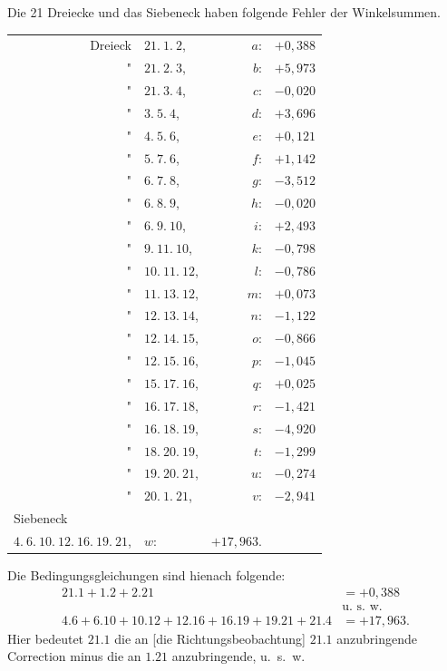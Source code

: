 \documentclass[12pt,a4paper]{article}
\theoremstyle{plain}
\theoremstyle{definition}
\theoremstyle{remark}
\begin{document}
Die 21 Dreiecke und das Siebeneck haben folgende Fehler der Winkelsummen.

\begin{center}
\begin{tabular}{r@{\ }l@{\ }r@{\ }l}
Dreieck & $21.\ 1.\ 2$, & $a$: & $+0{,}388$\\
" & $21.\ 2.\ 3$, & $b$: & $+5{,}973$\\
" & $21.\ 3.\ 4$, & $c$: & $-0{,}020$\\
" & $3.\ 5.\ 4$, & $d$: & $+3{,}696$\\
" & $4.\ 5.\ 6$, & $e$: & $+0{,}121$\\
" & $5.\ 7.\ 6$, & $f$: & $+1{,}142$\\
" & $6.\ 7.\ 8$, & $g$: & $-3{,}512$\\
" & $6.\ 8.\ 9$, & $h$: & $-0{,}020$\\
" & $6.\ 9.\ 10$, & $i$: & $+2{,}493$\\
" & $9.\ 11.\ 10$, & $k$: & $-0{,}798$\\
" & $10.\ 11.\ 12$, & $l$: & $-0{,}786$\\
" & $11.\ 13.\ 12$, & $m$: & $+0{,}073$\\
" & $12.\ 13.\ 14$, & $n$: & $-1{,}122$\\
" & $12.\ 14.\ 15$, & $o$: & $-0{,}866$\\
" & $12.\ 15.\ 16$, & $p$: & $-1{,}045$\\
" & $15.\ 17.\ 16$, & $q$: & $+0{,}025$\\
" & $16.\ 17.\ 18$, & $r$: & $-1{,}421$\\
" & $16.\ 18.\ 19$, & $s$: & $-4{,}920$\\
" & $18.\ 20.\ 19$, & $t$: & $-1{,}299$\\
" & $19.\ 20.\ 21$, & $u$: & $-0{,}274$\\
" & $20.\ 1.\ 21$, & $v$: & $-2{,}941$\\[4pt]
\multicolumn{2}{l}{Siebeneck}\\
$4.\ 6.\ 10.\ 12.\ 16.\ 19.\ 21$, & $w$: & $+17{,}963$.
\end{tabular}
\end{center}

Die Bedingungsgleichungen sind hienach folgende:
\begin{align*}
21.1 + 1.2 + 2.21 &= +0{,}388\\
&\text{u.\ s.\ w.}\\
4.6 + 6.10 + 10.12 + 12.16 + 16.19 + 19.21 + 21.4 &= +17{,}963.
\end{align*}
Hier bedeutet $21.1$ die an [die Richtungsbeobachtung] $21.1$ anzubringende Correction minus die an $1.21$ anzubringende, u.\ s.\ w.
\end{document}
